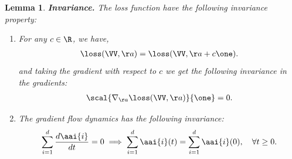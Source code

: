 \documentclass{article}
\theoremstyle{plain}
\newtheorem{lemma}[theorem]{Lemma}
\theoremstyle{definition}
\theoremstyle{remark}
\begin{document}
\begin{lemma}
\textbf{Invariance.} The loss function have the following invariance property:    

\begin{enumerate}[label=(\alph*)]
    \item For any $c \in \R$, we have, 
    \begin{align*}
        \loss(\VV, \aa) = \loss(\VV, \aa + c \one).
    \end{align*}
    and taking the gradient with respect to $c$ we get the following invariance in the gradients: 
    \begin{align*}
        \scal{\nabla_{\aa} \loss(\VV, \aa)}{\one} = 0.      
    \end{align*}
    \item The gradient flow dynamics has the following invariance:  
    \begin{align*}
        \sum_{i=1}^{d} \frac{d \aai{i}}{dt} = 0 \implies \sum_{i=1}^{d} \aai{i}(t) = \sum_{i=1}^{d} \aai{i}(0), \quad \forall t \geq 0.
    \end{align*}
\end{enumerate}
\end{lemma}
\end{document}
